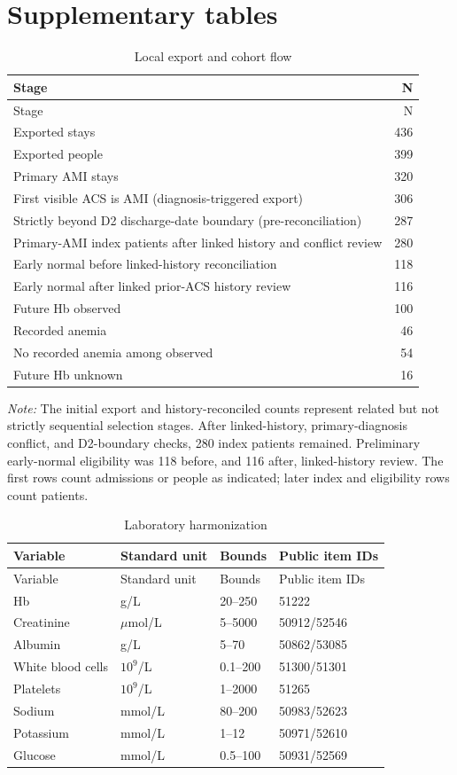 \documentclass[pdflatex,sn-vancouver-num]{sn-jnl}
\begin{document}
\section{Supplementary tables}
\begingroup\scriptsize\setlength{\tabcolsep}{2pt}
\begin{longtable}{p{8.5cm}r}
\caption{Local export and cohort flow}\label{tab:s1}\\
\toprule
Stage & N\\\midrule
\endfirsthead
\toprule
Stage & N\\\midrule
\endhead
\endfoot
\bottomrule\endlastfoot
Exported stays & 436\\
Exported people & 399\\
Primary AMI stays & 320\\
First visible ACS is AMI (diagnosis-triggered export) & 306\\
Strictly beyond D2 discharge-date boundary (pre-reconciliation) & 287\\
Primary-AMI index patients after linked history and conflict review & 280\\
Early normal before linked-history reconciliation & 118\\
Early normal after linked prior-ACS history review & 116\\
Future Hb observed & 100\\
Recorded anemia & 46\\
No recorded anemia among observed & 54\\
Future Hb unknown & 16\\
\end{longtable}
\noindent\textit{Note:} The initial export and history-reconciled counts represent related but not strictly sequential selection stages. After linked-history, primary-diagnosis conflict, and D2-boundary checks, 280 index patients remained. Preliminary early-normal eligibility was 118 before, and 116 after, linked-history review. The first rows count admissions or people as indicated; later index and eligibility rows count patients.\par\endgroup
\begingroup\scriptsize\setlength{\tabcolsep}{2pt}
\begin{longtable}{llll}
\caption{Laboratory harmonization}\label{tab:s2}\\
\toprule
Variable & Standard unit & Bounds & Public item IDs\\\midrule
\endfirsthead
\toprule
Variable & Standard unit & Bounds & Public item IDs\\\midrule
\endhead
\endfoot
\bottomrule\endlastfoot
Hb & g/L & 20--250 & 51222\\
Creatinine & $\mu$mol/L & 5--5000 & 50912/52546\\
Albumin & g/L & 5--70 & 50862/53085\\
White blood cells & $10^9$/L & 0.1--200 & 51300/51301\\
Platelets & $10^9$/L & 1--2000 & 51265\\
Sodium & mmol/L & 80--200 & 50983/52623\\
Potassium & mmol/L & 1--12 & 50971/52610\\
Glucose & mmol/L & 0.5--100 & 50931/52569\\
\end{longtable}
\end{document}
